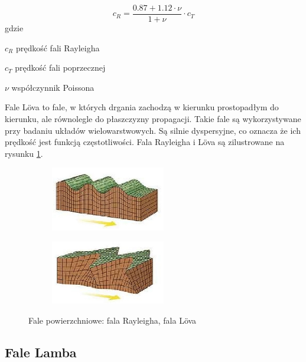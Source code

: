 \begin{equation}
c_R=\frac{0.87+1.12\cdot\nu}{1+\nu}\cdot c_T
\end{equation}
gdzie
\begin{eqwhere}[2cm]
        \item[$c_R$] prędkość fali Rayleigha
        \item[$c_T$] prędkość fali poprzecznej
        \item[$\nu$] współczynnik Poissona
\end{eqwhere}

Fale L\"{o}va to fale, w których drgania zachodzą w kierunku prostopadłym do kierunku, ale równolegle do płaszczyzny propagacji. Takie fale są wykorzystywane przy badaniu układów wielowarstwowych. Są silnie dyspersyjne, co oznacza że ich prędkość jest funkcją częstotliwości. Fala Rayleigha i L\"{o}va są zilustrowane na rysunku \ref{fig:fala_lowa}.

\begin{figure}[h]
        \centering
        \begin{subfigure}{0.35\textwidth}
                \centering
	     \includegraphics[width=5cm]{Zdjecia/2/fala_rayleigha}
                \subcaption{\label{subfigure_a}}
        \end{subfigure}
        \begin{subfigure}{0.35\textwidth}
                \centering
	     \includegraphics[width=5cm]{Zdjecia/2/fala_lova}
                \subcaption{\label{subfigure_b}}
        \end{subfigure}
        \caption{Fale powierzchniowe: \protect{} fala Rayleigha, \protect{} fala L\"{o}va \cite{bartek_fala_lowa}}
\label{fig:fala_lowa}
\end{figure}

\subsection{Fale Lamba}


